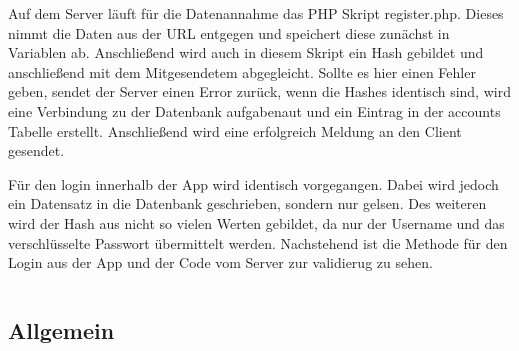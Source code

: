 Auf dem Server läuft für die Datenannahme das PHP Skript register.php. Dieses nimmt die Daten aus der URL entgegen und speichert diese zunächst in Variablen ab. Anschließend wird auch in diesem Skript ein Hash gebildet und anschließend mit dem Mitgesendetem abgegleicht. Sollte es hier einen Fehler geben, sendet der Server einen Error zurück, wenn die Hashes identisch sind, wird eine Verbindung zu der Datenbank aufgabenaut und ein Eintrag in der accounts Tabelle erstellt. Anschließend wird eine erfolgreich Meldung an den Client gesendet.

Für den login innerhalb der App wird identisch vorgegangen. Dabei wird jedoch ein Datensatz in die Datenbank geschrieben, sondern nur gelsen. Des weiteren wird der Hash aus nicht so vielen Werten gebildet, da nur der Username und das verschlüsselte Passwort übermittelt werden. Nachstehend ist die Methode für den Login aus der App und der Code vom Server zur validierug zu sehen.

\begin{scriptsize}
\lstset{
	float,
	caption=Skript SendDataToServer.cs, 
	language=[Sharp]C, 
	frame=single,  
	showstringspaces=false, 
	showspaces=false, 
	numbers=left, 
	captionpos=b, 
	belowcaptionskip=4pt,
	basicstyle=\ttfamily
} 
\newpage
\begin{lstlisting}[label=lst:c_Login]

\end{lstlisting}
\end{scriptsize}

\subsection{Allgemein}
